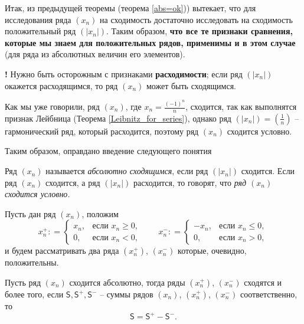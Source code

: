 \begin{remark}
    Итак, из предыдущей теоремы (теорема \ref{abs=ok})) вытекает, что для исследования ряда $(x_n)$ на сходимость достаточно исследовать на сходимость положительный ряд $(|x_n|)$. Таким образом, \textbf{что все те признаки сравнения, которые мы знаем для положительных рядов, применимы и в этом случае} (для ряда из абсолютных величин его элементов). 
\end{remark}

\begin{mydanger}{\bf{!}}
    Нужно быть осторожным с признаками \textbf{расходимости}; если ряд $(|x_n|)$ окажется расходящимся, то ряд $(x_n)$ может быть сходящимся.
\end{mydanger}

\begin{example}
    Как мы уже говорили, ряд $(x_n)$, где $x_n = \frac{(-1)^n}{n}$, сходится, так как выполнятся признак Лейбница (Теорема \ref{Leibnitz_for_series}), однако ряд $(|x_n|) = (\frac{1}{n})$ -- гармонический ряд, который расходится, поэтому ряд $(x_n)$ сходится условно.
\end{example}


Таким образом, оправдано введение следующего понятия
\begin{definition}
    Ряд $(x_n)$ называется \textit{абсолютно сходящимся}, если ряд $(|x_n|)$ сходится. Если ряд $(x_n)$ сходится, а ряд $(|x_n|)$ расходится, то говорят, что \textit{ряд $(x_n)$ сходится условно.}
\end{definition}

\begin{construction}\label{x_n^+}
 Пусть дан ряд $(x_n)$, положим
\[
 x_n^+: = \begin{cases}
     x_n, & \mbox{если $x_n \ge 0$},\\
     0, & \mbox{если $x_n <0$},
 \end{cases}
 \qquad
x_n^-: = \begin{cases}
     -x_n, & \mbox{если $x_n \le 0$},\\
     0, & \mbox{если $x_n >0$},
 \end{cases} 
\]
и будем рассматривать два ряда $(x_n^+)$, $(x_n^{-})$ которые, очевидно, положительны.     
\end{construction}


\begin{proposition}
 Пусть ряд $(x_n)$ сходится абсолютно, тогда ряды $(x_n^+)$, $(x_n^{-})$ сходятся и более того, если $\mathsf{S}, \mathsf{S}^+, \mathsf{S}^-$ -- суммы рядов $(x_n)$, $(x_n^+)$, $(x_n^-)$ соответственно, то
 \[
  \mathsf{S} = \mathsf{S}^+ - \mathsf{S}^-.
 \]
\end{proposition}

